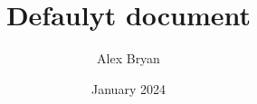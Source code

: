 \documentclass[12pt, letterpaper]{article}
\title{Defaulyt document}
\author{Alex Bryan}
\date{January 2024}
\begin{document}
\maketitle

\begin{comment}

\textbf{}                                        :for bold
\underline{}                                     :to underline
\textit{}                                        :for italics
\emph{}                                          :for context-based emphasis
\verb|text|                                      :like emphasis in terms of auto-formatting
\texttt{[image: name]}                  :includes graphic
\\                                               :newline, can also use double enter to start new paragraph
\newline


\begin{figure}[hpt]                              :[x] denotes ALLOWED page placement. h=source (with text), p=float (on own page w/o text), t=top of page, b=bottom of page, !=override formatting
    \centering
    \texttt{[image: name]} :configure figure to be scaled to 75%
    \caption[short]{title}                       :title configurations for the figure
    \label{fig:name}                         :labelling the figure with fig:name allows for \ref access. A figure number is automatically configured
\end{figure}

\begin{table}[h!]
    \centering
    \begin{tabular}{||c|c|c||}                   :create table. "c c c" denotes 3 centered rows, r and l can be used for right and left allignment as well. "|" indicates vertical column lines
                                                 :  "||" indicates double vertical column lines
        \hline                                   :horizontal line
        Col1 & Col2 & Col3 \\ [0.5ex]            :"&" demarcates individual cells, \\ indicates when to enter next row, [(X)ex] adds space below of X width
        \hline\hline                             :double \hline will split the vertical line within the table, creating a "floating" section
        cell1 & cell2 & cell3 \\
        cell4 & cell5 & cell6 \\  
        cell7 & cell8 & cell9 \\ [1ex]
        \hline
    \end{tabular}
    \caption{Caption}
    \label{table:name}
\end{table}                                      :NOTE: can use TablesGenerator.com to generate tables and export as .tex code


\end{comment}
\end{document}
